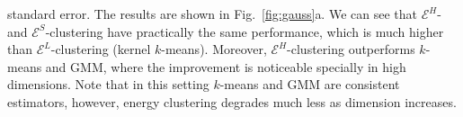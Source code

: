 \documentclass[aps,preprint,nofootinbib,floatfix]{revtex4-1}
\begin{document}
standard error.
The results are shown in Fig.~\ref{fig:gauss}a. We can see that
$\mathcal{E}^H$- and $\mathcal{E}^S$-clustering have practically
the same performance, which is 
much higher than $\mathcal{E}^L$-clustering (kernel
$k$-means). Moreover, $\mathcal{E}^H$-clustering outperforms 
$k$-means and GMM, where the improvement is noticeable specially in 
high dimensions.
Note that in this setting $k$-means and GMM are consistent estimators,
however, energy clustering degrades much less as dimension increases.
\end{document}
